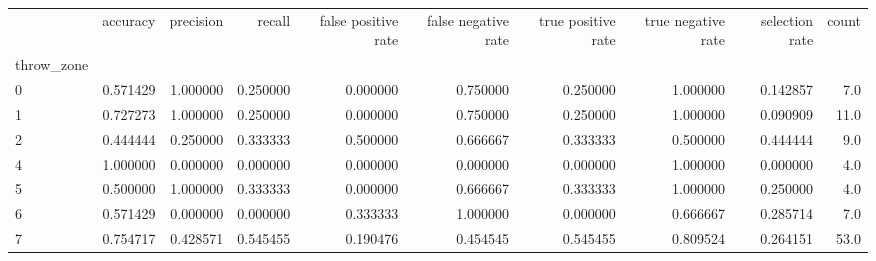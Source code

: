 \begin{tabular}{lrrrrrrrrr}
\toprule
{} &  accuracy &  precision &    recall &  false positive rate &  false negative rate &  true positive rate &  true negative rate &  selection rate &  count \\
throw\_zone &           &            &           &                      &                      &                     &                     &                 &        \\
\midrule
0          &  0.571429 &   1.000000 &  0.250000 &             0.000000 &             0.750000 &            0.250000 &            1.000000 &        0.142857 &    7.0 \\
1          &  0.727273 &   1.000000 &  0.250000 &             0.000000 &             0.750000 &            0.250000 &            1.000000 &        0.090909 &   11.0 \\
2          &  0.444444 &   0.250000 &  0.333333 &             0.500000 &             0.666667 &            0.333333 &            0.500000 &        0.444444 &    9.0 \\
4          &  1.000000 &   0.000000 &  0.000000 &             0.000000 &             0.000000 &            0.000000 &            1.000000 &        0.000000 &    4.0 \\
5          &  0.500000 &   1.000000 &  0.333333 &             0.000000 &             0.666667 &            0.333333 &            1.000000 &        0.250000 &    4.0 \\
6          &  0.571429 &   0.000000 &  0.000000 &             0.333333 &             1.000000 &            0.000000 &            0.666667 &        0.285714 &    7.0 \\
7          &  0.754717 &   0.428571 &  0.545455 &             0.190476 &             0.454545 &            0.545455 &            0.809524 &        0.264151 &   53.0 \\
\bottomrule
\end{tabular}

